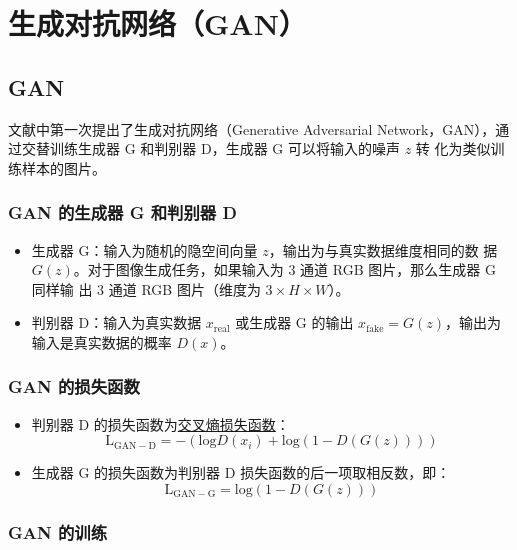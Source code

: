 \chapter{生成对抗网络（GAN）}

\section{GAN}

文献中第一次提出了生成对抗网络（Generative Adversarial
Network，GAN），通过交替训练生成器 G 和判别器 D，生成器 G 可以将输入的噪声 $z$ 转
化为类似训练样本的图片。

\subsection{GAN 的生成器 G 和判别器 D}

\begin{itemize}
  \item 生成器 G：输入为随机的隐空间向量 $z$，输出为与真实数据维度相同的数
    据 $G(z)$。对于图像生成任务，如果输入为 3 通道 RGB 图片，那么生成器 G 同样输
    出 3 通道 RGB 图片（维度为 $3 \times H \times W$）。
  \item 判别器 D：输入为真实数据 $x_{\mathrm{real}}$ 或生成器 G 的输出
    $x_{\mathrm{fake}} = G(z)$，输出为输入是真实数据的概率 $D(x)$。
\end{itemize}

\subsection{GAN 的损失函数}

\begin{itemize}
  \item 判别器 D 的损失函数为\hyperref[subsec:CELoss]{交叉熵损失函数}：
  \begin{equation}
    \label{equ:GAN-D}
    \mathrm{L}_{\mathrm{GAN-D}} = - \left( \mathrm{log} D(x_i) + \mathrm{log} (1-D(G(z))) \right )
  \end{equation}

  \item 生成器 G 的损失函数为判别器 D 损失函数的后一项取相反数，即：
  \begin{equation}
    \label{equ:GAN-G}
    \mathrm{L}_{\mathrm{GAN-G}} =  \mathrm{log} (1-D(G(z)))
  \end{equation}
\end{itemize}

\subsection{GAN 的训练}

